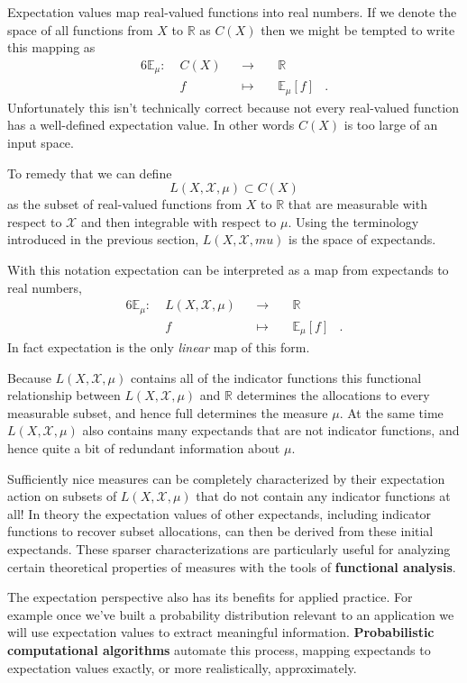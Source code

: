 \documentclass[
  letterpaper,
  DIV=11,
  numbers=noendperiod]{scrartcl}
\begin{document}
Expectation values map real-valued functions into real numbers. If we
denote the space of all functions from \(X\) to \(\mathbb{R}\) as
\(C(X)\) then we might be tempted to write this mapping as
\begin{alignat*}{6}
\mathbb{E}_{\mu} :\; & C(X) & &\rightarrow& \; & \mathbb{R} &
\\
& f & &\mapsto& & \mathbb{E}_{\mu}[f] &.
\end{alignat*} Unfortunately this isn't technically correct because not
every real-valued function has a well-defined expectation value. In
other words \(C(X)\) is too large of an input space.

To remedy that we can define \[
L(X, \mathcal{X}, \mu) \subset C(X)
\] as the subset of real-valued functions from \(X\) to \(\mathbb{R}\)
that are measurable with respect to \(\mathcal{X}\) and then integrable
with respect to \(\mu\). Using the terminology introduced in the
previous section, \(L(X, \mathcal{X}, mu)\) is the space of expectands.

With this notation expectation can be interpreted as a map from
expectands to real numbers, \begin{alignat*}{6}
\mathbb{E}_{\mu} :\; & L(X, \mathcal{X}, \mu) & &\rightarrow& \;
& \mathbb{R} &
\\
& f & &\mapsto& & \mathbb{E}_{\mu}[f] &.
\end{alignat*} In fact expectation is the only \emph{linear} map of this
form.

Because \(L(X, \mathcal{X}, \mu)\) contains all of the indicator
functions this functional relationship between
\(L(X, \mathcal{X}, \mu)\) and \(\mathbb{R}\) determines the allocations
to every measurable subset, and hence full determines the measure
\(\mu\). At the same time \(L(X, \mathcal{X}, \mu)\) also contains many
expectands that are not indicator functions, and hence quite a bit of
redundant information about \(\mu\).

Sufficiently nice measures can be completely characterized by their
expectation action on subsets of \(L(X, \mathcal{X}, \mu)\) that do not
contain any indicator functions at all! In theory the expectation values
of other expectands, including indicator functions to recover subset
allocations, can then be derived from these initial expectands. These
sparser characterizations are particularly useful for analyzing certain
theoretical properties of measures with the tools of \textbf{functional
analysis}.

The expectation perspective also has its benefits for applied practice.
For example once we've built a probability distribution relevant to an
application we will use expectation values to extract meaningful
information. \textbf{Probabilistic computational algorithms} automate
this process, mapping expectands to expectation values exactly, or more
realistically, approximately.
\end{document}
